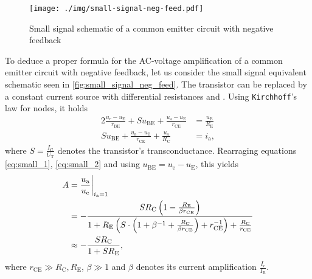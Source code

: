 \begin{figure}[tbp]
	\centering
	\texttt{[image: ./img/small-signal-neg-feed.pdf]}
	\caption{Small signal schematic of a common emitter circuit with negative feedback}
	\label{fig:small_signal_neg_feed}
\end{figure}

To deduce a proper formula for the AC-voltage amplification of a common emitter circuit with negative feedback, let us consider the small signal equivalent schematic seen in \autoref{fig:small_signal_neg_feed}.
The transistor can be replaced by a constant current source with differential resistances  and .
Using \texttt{Kirchhoff}'s law for nodes, it holds
\begin{alignat}{2}
	\frac{u_\text{e}-u_\text{E}}{r_\text{BE}}+Su_\text{BE}+\frac{u_\text{a}-u_\text{E}}{r_\text{CE}} &= \frac{u_\text{E}}{R_\text{E}} \label{eq:small_1}\\
	Su_\text{BE}+\frac{u_\text{a}-u_\text{E}}{r_\text{CE}} + \frac{u_\text{a}}{R_\text{C}}&= i_\text{a}, \label{eq:small_2}
\end{alignat}
where $S=\frac{I_\text{C}}{U_\text{T}}$ denotes the transistor's transconductance.
Rearraging equations \ref{eq:small_1}, \ref{eq:small_2} and using $u_\text{BE}=u_\text{e}-u_\text{E}$, this yields
\begin{align}
	A&=\frac{u_\text{a}}{u_\text{e}}\at[\bigg]{i_\text{a}=1} \nonumber \\
	&=-\frac{SR_\text{C}\left(1-\frac{R_\text{E}}{\beta r_\text{CE}}\right)}{1+R_\text{E}\left(S\cdot\left(1+\beta^{-1}+\frac{R_\text{C}}{\beta r_\text{CE}}\right)+r_\text{CE}^{-1}\right)+\frac{R_\text{C}}{r_\text{CE}}} \nonumber \\
	&\approx -\frac{SR_\text{C}}{1+SR_\text{E}}, \label{eq:amp_neg_fb}
\end{align}
where $r_\text{CE}\gg R_\text{C},R_\text{E}$, $\beta\gg 1$ and $\beta$ denotes its current amplification $\frac{I_\text{c}}{I_\text{B}}$.
